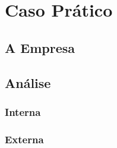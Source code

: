 
\section{Caso Prático}



\subsection{A Empresa} 

\subsection{Análise}

\subsubsection{Interna}

\subsubsection{Externa}